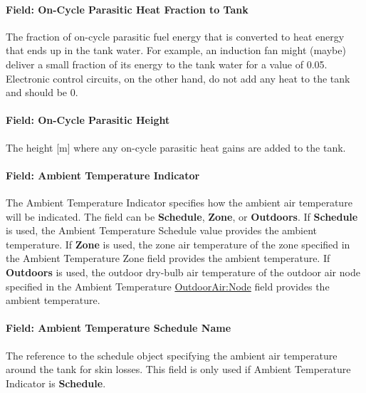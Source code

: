 \paragraph{Field: On-Cycle Parasitic Heat Fraction to Tank}\label{field-on-cycle-parasitic-heat-fraction-to-tank-1}

The fraction of on-cycle parasitic fuel energy that is converted to heat energy that ends up in the tank water. For example, an induction fan might (maybe) deliver a small fraction of its energy to the tank water for a value of 0.05. Electronic control circuits, on the other hand, do not add any heat to the tank and should be 0.

\paragraph{Field: On-Cycle Parasitic Height}\label{field-on-cycle-parasitic-height}

The height {[}m{]} where any on-cycle parasitic heat gains are added to the tank.

\paragraph{Field: Ambient Temperature Indicator}\label{field-ambient-temperature-indicator-1-000}

The Ambient Temperature Indicator specifies how the ambient air temperature will be indicated. The field can be \textbf{Schedule}, \textbf{Zone}, or \textbf{Outdoors}. If \textbf{Schedule} is used, the Ambient Temperature Schedule value provides the ambient temperature. If \textbf{Zone} is used, the zone air temperature of the zone specified in the Ambient Temperature Zone field provides the ambient temperature. If \textbf{Outdoors} is used, the outdoor dry-bulb air temperature of the outdoor air node specified in the Ambient Temperature \hyperref[outdoorairnode]{OutdoorAir:Node} field provides the ambient temperature.

\paragraph{Field: Ambient Temperature Schedule Name}\label{field-ambient-temperature-schedule-name-1-000}

The reference to the schedule object specifying the ambient air temperature around the tank for skin losses. This field is only used if Ambient Temperature Indicator is \textbf{Schedule}.

